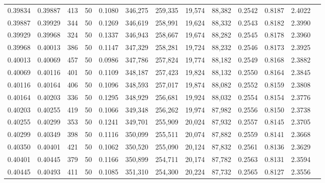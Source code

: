 \begin{tabular}{rrrrrrrrrrrrr}
0.39834 & 0.39887 &   413 &  50 &                                     0.1080 & 346,275 & 259,335 &  19,574 &  88,382 & 0.2542 & 0.8187 & 2.4022 \\
0.39887 & 0.39929 &   344 &  50 &                                     0.1269 & 346,619 & 258,991 &  19,624 &  88,332 & 0.2543 & 0.8182 & 2.3990 \\
0.39929 & 0.39968 &   324 &  50 &                                     0.1337 & 346,943 & 258,667 &  19,674 &  88,282 & 0.2545 & 0.8178 & 2.3960 \\
0.39968 & 0.40013 &   386 &  50 &                                     0.1147 & 347,329 & 258,281 &  19,724 &  88,232 & 0.2546 & 0.8173 & 2.3925 \\
0.40013 & 0.40069 &   457 &  50 &                                     0.0986 & 347,786 & 257,824 &  19,774 &  88,182 & 0.2549 & 0.8168 & 2.3882 \\
0.40069 & 0.40116 &   401 &  50 &                                     0.1109 & 348,187 & 257,423 &  19,824 &  88,132 & 0.2550 & 0.8164 & 2.3845 \\
0.40116 & 0.40164 &   406 &  50 &                                     0.1096 & 348,593 & 257,017 &  19,874 &  88,082 & 0.2552 & 0.8159 & 2.3808 \\
0.40164 & 0.40203 &   336 &  50 &                                     0.1295 & 348,929 & 256,681 &  19,924 &  88,032 & 0.2554 & 0.8154 & 2.3776 \\
0.40203 & 0.40255 &   419 &  50 &                                     0.1066 & 349,348 & 256,262 &  19,974 &  87,982 & 0.2556 & 0.8150 & 2.3738 \\
0.40255 & 0.40299 &   353 &  50 &                                     0.1241 & 349,701 & 255,909 &  20,024 &  87,932 & 0.2557 & 0.8145 & 2.3705 \\
0.40299 & 0.40349 &   398 &  50 &                                     0.1116 & 350,099 & 255,511 &  20,074 &  87,882 & 0.2559 & 0.8141 & 2.3668 \\
0.40350 & 0.40401 &   421 &  50 &                                     0.1062 & 350,520 & 255,090 &  20,124 &  87,832 & 0.2561 & 0.8136 & 2.3629 \\
0.40401 & 0.40445 &   379 &  50 &                                     0.1166 & 350,899 & 254,711 &  20,174 &  87,782 & 0.2563 & 0.8131 & 2.3594 \\
0.40445 & 0.40493 &   411 &  50 &                                     0.1085 & 351,310 & 254,300 &  20,224 &  87,732 & 0.2565 & 0.8127 & 2.3556 \\

\end{tabular}
